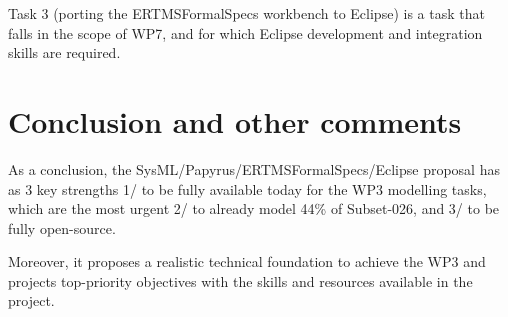 Task 3 (porting the ERTMSFormalSpecs workbench to Eclipse) is a task that falls in the scope of WP7, and for which Eclipse development and integration skills are required.

\section{Conclusion and other comments}

As a conclusion, the SysML/Papyrus/ERTMSFormalSpecs/Eclipse proposal has as 3 key strengths 1/ to be fully available today for the WP3 modelling tasks, which are the most urgent 2/ to already model 44\% of Subset-026, and 3/ to be fully open-source. 

Moreover, it proposes a realistic technical foundation to achieve the WP3 and projects top-priority objectives with the skills and resources available in the project.
